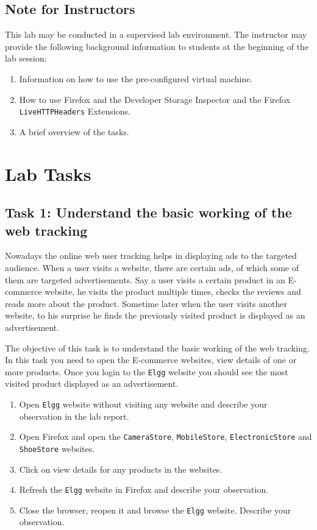 \subsection{Note for Instructors} 

This lab may be conducted in a
supervised lab environment. The instructor may provide the following
background information to students at the beginning of the lab session:
\begin{enumerate}
  \item Information on how to use the pre-configured virtual machine.
  \item How to use Firefox and the Developer Storage Inspector and
the Firefox {\tt LiveHTTPHeaders} Extensions.
  \item A brief overview of the tasks.
       
\end{enumerate}


\section{Lab Tasks}


\subsection{Task 1: Understand the basic working of the web tracking}

Nowadays the online web user tracking helps in displaying ads to the targeted audience. 
When a user visits a website, there are certain ads, of which some of them are targeted advertisements. 
Say a user visits a certain product in an E-commerce website, he visits the product multiple times, checks the reviews and reads more about the product.
Sometime later when the user visits another website, to his surprise he finds the previously visited product is displayed as an advertisement.

The objective of this task is to understand the basic working of the web tracking. 
In this task you need to open the E-commerce websites, view details of one or more products. 
Once you login to the {\tt Elgg} website you should see the most visited product displayed as an advertisement. 


\begin{enumerate}
  \item Open {\tt Elgg} website without visiting any website and describe your observation in the lab report.
  \item Open Firefox and open the {\tt CameraStore}, {\tt MobileStore}, {\tt ElectronicStore} and {\tt ShoeStore} websites.
  \item Click on view details for any products in the websites.
  \item Refresh the {\tt Elgg} website in Firefox and describe your observation.
  \item Close the browser, reopen it and browse the {\tt Elgg} website. Describe your observation.       
\end{enumerate}


